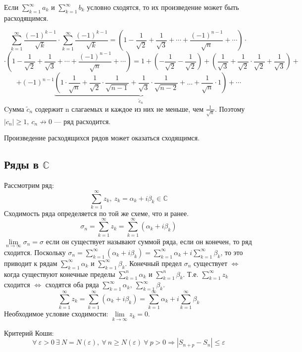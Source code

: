 \documentclass[../../main.tex]{subfiles}
\begin{document}
Если $\sum\limits_{k = 1}^{\infty} a_k$ и
$\sum\limits_{k = 1}^{\infty} b_k$ условно сходятся, то их произведение
может быть расходящимся.
\begin{example}
	\[\sum\limits_{k = 1}^{\infty} \frac{(-1)^{k-1}}{\sqrt{k}} \cdot
	\sum\limits_{k = 1}^{\infty} \frac{(-1)^{k-1}}{\sqrt{k}} =
	\left(1 - \frac{1}{\sqrt{2}} + \frac{1}{\sqrt{3}} + \cdots +
	\frac{(-1)^{n-1}}{\sqrt{n}} + \cdots \right) \cdot \]
	\[\cdot \left(1 - \frac{1}{\sqrt{2}} + \frac{1}{\sqrt{3}} + \cdots +
	\frac{(-1)^{n-1}}{\sqrt{n}} + \cdots \right) = 1 +
	\left( - \frac{1}{\sqrt{2}} - \frac{1}{\sqrt{2}} \right) +
	\left( \frac{1}{\sqrt{3}} + \frac{1}{\sqrt{2}} \cdot
	\frac{1}{\sqrt{2}} + \frac{1}{\sqrt{3}} \right) + \] 
	\[ + \left( -1 \right) ^ {n - 1}
	\underbrace{\left(1 \cdot \frac{1}{\sqrt{n}} + \frac{1}{\sqrt{2}} \cdot
	\frac{1}{\sqrt{n - 1}} + \frac{1}{\sqrt{3}} \cdot
	\frac{1}{\sqrt{n - 2}} + \ldots + \frac{1}{\sqrt{n}} \cdot 1\right)}_{\tilde{c}_n} + \cdots \]
	Cумма $\tilde{c}_n$ содержит n слагаемых и каждое из них не меньше,
	чем $\frac{1}{\sqrt{n}}$. Поэтому $|c_n| \geq 1, \ c_n \not\to 0$
	--- ряд расходится.
\end{example}
\begin{remark}
	Произведение расходящихся рядов может оказаться сходящимся.
\end{remark}
\subsection{Ряды в $\mathbb{C}$}
Рассмотрим ряд:
\[\sum\limits_{k = 1}^{\infty} z_k , \ z_k = \alpha_k + i\beta_k \in \mathbb{C}\]
Сходимость ряда определяется по той же схеме, что и ранее.
\[ \sigma_n = \sum\limits_{k = 1}^{\infty} z_k =
\sum\limits_{k = 1}^{\infty} (\alpha_k + i\beta_k)\]
$\lim\limits_{n \to \infty} \sigma_n = \sigma$
если он существует называют суммой ряда, если он конечен, то ряд сходится.
Поскольку $\sigma_n = \sum\limits_{k = 1}^{\infty} (\alpha_k + i\beta_k) =
\sum\limits_{k = 1}^{\infty} \alpha_k + i \sum\limits_{k = 1}^{\infty} \beta_k$,
то это приводит к рядам $\sum\limits_{k = 1}^{\infty} \alpha_k$ и
$\sum\limits_{k = 1}^{\infty} \beta_k$.
Конечный предел $\sigma_n$ существует $\Longleftrightarrow$ когда
существуют конечные пределы $\sum\limits_{k = 1}^{n} \alpha_k$ и
$\sum\limits_{k = 1}^{n} \beta_k$.
Т.е. $\sum\limits_{k = 1}^{\infty} z_k$ сходится $\Longleftrightarrow$
сходятся оба ряда $\sum\limits_{k = 1}^{\infty} \alpha_k , \
\sum\limits_{k = 1}^{\infty} \beta_k$.
\[\sum\limits_{k = 1}^{\infty} z_k = \sum\limits_{k = 1}^{\infty}
(\alpha_k + i\beta_k) = \sum\limits_{k = 1}^{\infty} \alpha_k +
i\sum\limits_{k = 1}^{\infty} \beta_k\]
Необходимое условие сходимости: $\lim\limits_{k \to \infty} z_k = 0$.

Критерий Коши:
\[ \forall \ \varepsilon > 0 \ \exists \ N = N(\varepsilon), \ \forall \
n \geq N(\varepsilon) \ \forall \ p > 0 \Longrightarrow
|S_{n + p} - S_n| \leq \varepsilon \]
\end{document}
